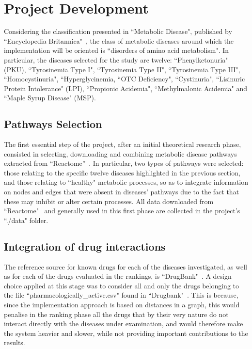 \chapter{Project Development}\label{chap:project}

Considering the classification presented in ``Metabolic Disease", published by ``Encyclopedia Britannica"~\cite{britannica}, the class of metabolic diseases around which the implementation will be oriented is ``disorders of amino acid metabolism". In particular, the diseases selected for the study are twelve: ``Phenylketonuria" (PKU), ``Tyrosinemia Type I", ``Tyrosinemia Type II", ``Tyrosinemia Type III", ``Homocystinuria", ``Hyperglycinemia, ``OTC Deficiency", ``Cystinuria", ``Lisinuric Protein Intolerance" (LPI), ``Propionic Acidemia", ``Methylmalonic Acidemia" and ``Maple Syrup Disease" (MSP).

\section{Pathways Selection}

The first essential step of the project, after an initial theoretical research phase, consisted in selecting, downloading and combining metabolic disease pathways extracted from ``Reactome''~\cite{reactome}. In particular, two types of pathways were selected: those relating to the specific twelve diseases highlighted in the previous section, and those relating to ``healthy" metabolic processes, so as to integrate information on nodes and edges that were absent in diseases' pathways due to the fact that these may inhibit or alter certain processes. All data downloaded from ``Reactome"~\cite{reactome} and generally used in this first phase are collected in the project's ``./data" folder.

\section{Integration of drug interactions}
The reference source for known drugs for each of the diseases investigated, as well as for each of the drugs evaluated in the rankings, is ``DrugBank"~\cite{drugbank}.
A design choice applied at this stage was to consider all and only the drugs belonging to the file ``pharmacologically\_active.csv" found in ``Drugbank"~\cite{drugbank}. This is because, since the implementation approach is based on distances in a graph, this would penalise in the ranking phase all the drugs that by their very nature do not interact directly with the diseases under examination, and would therefore make the system heavier and slower, while not providing important contributions to the results.

